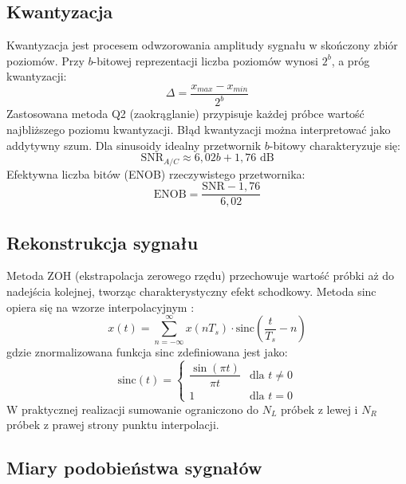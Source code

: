 \documentclass[12pt]{article}
\begin{document}
\subsection{Kwantyzacja}

Kwantyzacja jest procesem odwzorowania amplitudy sygnału w skończony zbiór poziomów.
Przy $b$-bitowej reprezentacji liczba poziomów wynosi $2^b$, a próg kwantyzacji:
\begin{equation}
    \Delta = \frac{x_{max} - x_{min}}{2^b}
\end{equation}
Zastosowana metoda Q2 (zaokrąglanie) przypisuje każdej próbce wartość
najbliższego poziomu kwantyzacji. Błąd kwantyzacji można interpretować jako
addytywny szum. Dla sinusoidy idealny przetwornik $b$-bitowy charakteryzuje się:
\begin{equation}
    \text{SNR}_{A/C} \approx 6{,}02b + 1{,}76 \text{ dB}
\end{equation}
Efektywna liczba bitów (ENOB) rzeczywistego przetwornika:
\begin{equation}
    \text{ENOB} = \frac{\text{SNR} - 1{,}76}{6{,}02}
\end{equation}

\subsection{Rekonstrukcja sygnału}

Metoda ZOH (ekstrapolacja zerowego rzędu) przechowuje wartość próbki
aż do nadejścia kolejnej, tworząc charakterystyczny efekt schodkowy.
Metoda sinc opiera się na wzorze interpolacyjnym \cite{instrukcja do zadania}:
\begin{equation}
    x(t) = \sum_{n=-\infty}^{\infty} x(nT_s) \cdot \text{sinc}\!\left(\frac{t}{T_s} - n\right)
\end{equation}
gdzie znormalizowana funkcja sinc zdefiniowana jest jako:
\begin{equation}
    \text{sinc}(t) =
    \begin{cases}
        \dfrac{\sin(\pi t)}{\pi t} & \text{dla } t \neq 0 \\[6pt]
        1 & \text{dla } t = 0
    \end{cases}
\end{equation}
W praktycznej realizacji sumowanie ograniczono do $N_L$ próbek z lewej
i $N_R$ próbek z prawej strony punktu interpolacji.

\subsection{Miary podobieństwa sygnałów}
\end{document}

